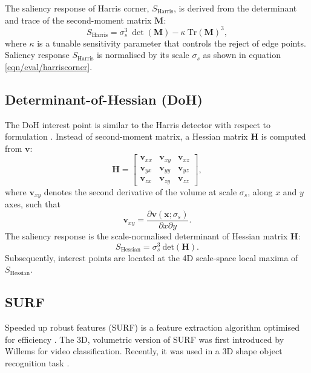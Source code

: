 The saliency response of Harris corner, $S_\textrm{Harris}$, is derived from the determinant and trace of the second-moment matrix $\mathbf{M}$: 
\begin{equation}
	S_\textrm{Harris} = \sigma_{s}^3 \:\det(\mathbf{M}) - \kappa\:\mathrm{Tr(\mathbf{M})}^3,
	\label{eqn/eval/harriscorner}
\end{equation}
where $\kappa$ is a tunable sensitivity parameter that controls the reject of edge points.  
Saliency response $S_\textrm{Harris}$ is normalised by its scale $\sigma_s$ as shown in equation \ref{eqn/eval/harriscorner}.

\subsection{Determinant-of-Hessian (DoH)}
\label{sec/eval/doh}
The DoH interest point is similar to the Harris detector with respect to formulation \cite{Lindeberg1998}. Instead of second-moment matrix, a Hessian matrix $\mathbf{H}$ is computed from $\mathbf{v}$: 
\begin{equation}
	\mathbf{H} = 
	\left[
		\begin{array}{ccc}
			\mathbf{v}_{xx} & \mathbf{v}_{xy} & \mathbf{v}_{xz} \\
			\mathbf{v}_{yx} & \mathbf{v}_{yy} & \mathbf{v}_{yz} \\
			\mathbf{v}_{zx} & \mathbf{v}_{zy} & \mathbf{v}_{zz} 
		\end{array}
	\right],
	\label{eqn/eval/hessianmatrix}
\end{equation}
where $\mathbf{v}_{xy}$ denotes the second derivative of the volume at scale $\sigma_s$, along $x$ and $y$ axes, such that
\begin{equation}
	\mathbf{v}_{xy} = \displaystyle\frac{\partial \mathbf{v}(\mathbf{x};\sigma_s)}{\partial x \partial y}.
	\label{eqn/eval/hessiandiverative}
\end{equation}
The saliency response is the scale-normalised determinant of Hessian matrix $\mathbf{H}$:
\begin{equation}
	S_{\textrm{Hessian}} = \sigma^3_s \:\mathrm{det}(\mathbf{H}).
	\label{eqn/eval/hessiansaliency}
\end{equation}
Subsequently, interest points are located at the 4D scale-space local maxima of $S_\textrm{Hessian}$.

\subsection{SURF}
Speeded up robust features (SURF) is a feature extraction algorithm optimised for efficiency \cite{Bay2008}. The 3D, volumetric version of SURF was first introduced by Willems \etal \cite{Willems2008} for video classification. Recently, it was used in a 3D shape object recognition task \cite{Knopp2010}.

